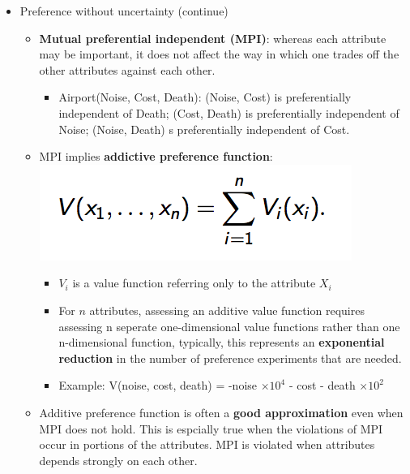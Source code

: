 \documentclass[12pt]{article}
\begin{document}
\begin{tcolorbox}
\begin{itemize}
\item Preference without uncertainty (continue)
\begin{itemize}
\item \textbf{Mutual preferential independent (MPI)}: whereas each attribute may be important, it does not affect the way in which one trades off the other attributes against each other. 
\begin{itemize}
\item Airport(Noise, Cost, Death): (Noise, Cost) is preferentially independent of Death; (Cost, Death) is preferentially independent of Noise; (Noise, Death) s preferentially independent of Cost.
\end{itemize}
\item MPI implies \textbf{addictive preference function}:\\
\includegraphics[scale=0.5]{p20}
 \begin{itemize}
 \item $V_i$ is a value function referring only to the attribute $X_i$
 \item For $n$ attributes, assessing an additive value function requires assessing n seperate one-dimensional value functions rather than one n-dimensional function, typically, this represents an \textbf{exponential reduction} in the number of preference experiments that are needed.
 \item Example: V(noise, cost, death) = -noise $\times 10^4$ - cost - death $\times 10^2$ 
 \end{itemize}
\item Additive preference function is often a \textbf{good approximation} even when MPI does not hold. This is espcially true when the violations of MPI occur in portions of the attributes. MPI is violated when attributes depends strongly on each other. 
\end{itemize}

\end{itemize}
\end{tcolorbox}
\end{document}
